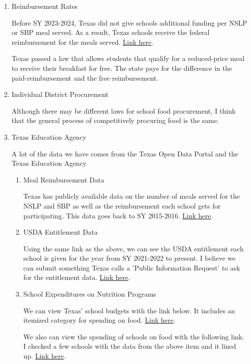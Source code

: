 \documentclass[12pt]{article}
\begin{document}
\begin{enumerate}
	\item Reimbursement Rates 
	
	Before SY 2023-2024, Texas did not give schools additional funding per NSLP or SBP meal served. As a result, Texas schools receive the federal reimbursement for the meals served. \href{https://www.fns.usda.gov/cn/rates-reimbursement}{Link here}.
	
	Texas passed a law that allows students that qualify for a reduced-price meal to receive their breakfast for free. The state pays for the difference in the paid-reimbursement and the free reimbursement. 
	
	\item Individual District Procurement
	
	Although there may be different laws for school food procurement, I think that the general process of competitively procuring food is the same. 
	
	\item Texas Education Agency
	
	A lot of the data we have comes from the Texas Open Data Portal and the Texas Education Agency. 
	\begin{enumerate}
		\item Meal Reimbursement Data
		
		Texas has publicly available data on the number of meals served for the NSLP and SBP as well as the reimbursement each school gets for participating. This data goes back to SY 2015-2016. \href{https://data.texas.gov/stories/s/TDA-Data-Overview-School-Nutrition-Programs/e2dm-5r4v/#data-available-on-school-nutrition-programs}{Link here}.
		
		\item USDA Entitlement Data
		
		Using the same link as the above, we can see the USDA entitlement each school is given for the year from SY 2021-2022 to present. I believe we can submit something Texas calls a 'Public Information Request' to ask for the entitlement data. \href{https://data.texas.gov/stories/s/TDA-Data-Overview-School-Nutrition-Programs/e2dm-5r4v/#data-available-on-school-nutrition-programs}{Link here}.
		
		\item School Expenditures on Nutrition Programs
		
		We can view Texas' school budgets with the link below. It includes an itemized category for spending on food. \href{https://rptsvr1.tea.texas.gov/school.finance/forecasting/financial_reports/1516_FinBudRep.html}{Link here}.
		
		We also can view the spending of schools on food with the following link. I checked a few schools with the data from the above item and it lined up. \href{https://tea.texas.gov/finance-and-grants/state-funding/state-funding-reports-and-data/peims-single-file-financial-data-downloads}{Link here}.
		
		
	\end{enumerate}


\end{enumerate}
	
\end{document}
